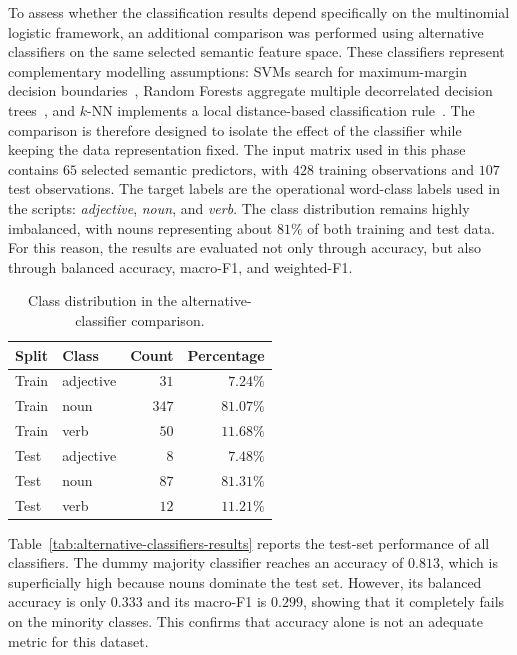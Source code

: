 \documentclass{ipgpmaster}
\begin{document}
To assess whether the classification results depend specifically on the multinomial logistic framework, an additional comparison was performed using alternative classifiers on the same selected semantic feature space. These classifiers represent complementary modelling assumptions: SVMs search for maximum-margin decision boundaries~\cite{cortes1995support}, Random Forests aggregate multiple decorrelated decision trees~\cite{breiman2001random}, and \(k\)-NN implements a local distance-based classification rule~\cite{cover1967nearest}. The comparison is therefore designed to isolate the effect of the classifier while keeping the data representation fixed.
The input matrix used in this phase contains \(65\) selected semantic predictors, with \(428\) training observations and \(107\) test observations. The target labels are the operational word-class labels used in the scripts: \emph{adjective}, \emph{noun}, and \emph{verb}. The class distribution remains highly imbalanced, with nouns representing about \(81\%\) of both training and test data. For this reason, the results are evaluated not only through accuracy, but also through balanced accuracy, macro-F1, and weighted-F1.

\begin{table}[H]
\centering
\begin{tabular}{llrr}
\hline
\textbf{Split} & \textbf{Class} & \textbf{Count} & \textbf{Percentage} \\
\hline
Train & adjective & \(31\) & \(7.24\%\) \\
Train & noun & \(347\) & \(81.07\%\) \\
Train & verb & \(50\) & \(11.68\%\) \\
\hline
Test & adjective & \(8\) & \(7.48\%\) \\
Test & noun & \(87\) & \(81.31\%\) \\
Test & verb & \(12\) & \(11.21\%\) \\
\hline
\end{tabular}
\caption{Class distribution in the alternative-classifier comparison.}
\label{tab:alternative-classifiers-class-distribution}
\end{table}

Table~\ref{tab:alternative-classifiers-results} reports the test-set performance of all classifiers. The dummy majority classifier reaches an accuracy of \(0.813\), which is superficially high because nouns dominate the test set. However, its balanced accuracy is only \(0.333\) and its macro-F1 is \(0.299\), showing that it completely fails on the minority classes. This confirms that accuracy alone is not an adequate metric for this dataset.
\end{document}
